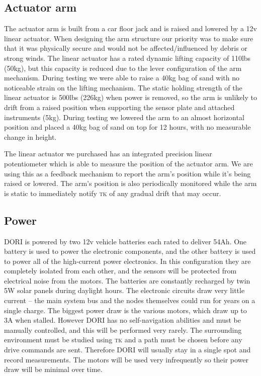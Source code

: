 \documentclass[12pt]{article}
\begin{document}
    \subsection{Actuator arm}
    The actuator arm is built from a car floor jack and is raised and lowered by a 12v linear actuator. When designing the arm structure our priority was to make sure that it was physically secure and would not be affected/influenced by debris or strong winds. The linear actuator has a rated dynamic lifting capacity of 110lbs (50kg), but this capacity is reduced due to the lever configuration of the arm mechanism. During testing we were able to raise a 40kg bag of sand with no noticeable strain on the lifting mechanism. The static holding strength of the linear actuator is 500lbs (226kg) when power is removed, so the arm is unlikely to drift from a raised position when supporting the sensor plate and attached instruments (5kg). During testing we lowered the arm to an almost horizontal position and placed a 40kg bag of sand on top for 12 hours, with no measurable change in height.

    The linear actuator we purchased has an integrated precision linear potentiometer which is able to measure the position of the actuator arm. We are using this as a feedback mechanism to report the arm's position while it's being raised or lowered. The arm's position is also periodically monitored while the arm is static to immediately notify \textsc{tk} of any gradual drift that may occur.

    \subsection{Power}
    DORI is powered by two 12v vehicle batteries each rated to deliver 54Ah. One battery is used to power the electronic components, and the other battery is used to power all of the high-current power electronics. In this configuration they are completely isolated from each other, and the sensors will be protected from electrical noise from the motors. The batteries are constantly recharged by twin 5W solar panels during daylight hours. The electronic circuits draw very little current -- the main system bus and the nodes themselves could run for years on a single charge. The biggest power draw is the various motors, which draw up to 3A when stalled. However DORI has no self-navigation abilities and must be manually controlled, and this will be performed very rarely. The surrounding environment must be studied using \textsc{tk} and a path must be chosen before any drive commands are sent. Therefore DORI will usually stay in a single spot and record measurements. The motors will be used very infrequently so their power draw will be minimal over time.
\end{document}
